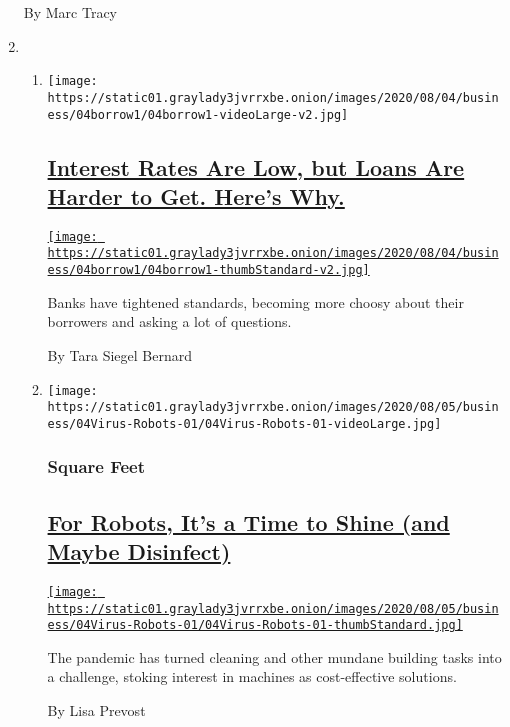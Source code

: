 \begin{enumerate}
  By Marc Tracy
\item
  \begin{enumerate}
  \def\labelenumii{\arabic{enumii}.}
  \item
    \texttt{[image: https://static01.graylady3jvrrxbe.onion/images/2020/08/04/business/04borrow1/04borrow1-videoLarge-v2.jpg]}

    \hypertarget{interest-rates-are-low-but-loans-are-harder-to-get-heres-why}{%
    \subsection{\texorpdfstring{\href{/2020/08/04/your-money/mortgage-loans-credit-cards-coronavirus.html}{Interest
    Rates Are Low, but Loans Are Harder to Get. Here's
    Why.}}{Interest Rates Are Low, but Loans Are Harder to Get. Here's Why.}}\label{interest-rates-are-low-but-loans-are-harder-to-get-heres-why}}

    \href{/2020/08/04/your-money/mortgage-loans-credit-cards-coronavirus.html}{\texttt{[image: https://static01.graylady3jvrrxbe.onion/images/2020/08/04/business/04borrow1/04borrow1-thumbStandard-v2.jpg]}}

    Banks have tightened standards, becoming more choosy about their
    borrowers and asking a lot of questions.

    By Tara Siegel Bernard
  \item
    \texttt{[image: https://static01.graylady3jvrrxbe.onion/images/2020/08/05/business/04Virus-Robots-01/04Virus-Robots-01-videoLarge.jpg]}

    \hypertarget{square-feet}{%
    \subsubsection{Square Feet}\label{square-feet}}

    \hypertarget{for-robots-its-a-time-to-shine-and-maybe-disinfect}{%
    \subsection{\texorpdfstring{\href{/2020/08/04/business/robot-cleaning-coronavirus.html}{For
    Robots, It's a Time to Shine (and Maybe
    Disinfect)}}{For Robots, It's a Time to Shine (and Maybe Disinfect)}}\label{for-robots-its-a-time-to-shine-and-maybe-disinfect}}

    \href{/2020/08/04/business/robot-cleaning-coronavirus.html}{\texttt{[image: https://static01.graylady3jvrrxbe.onion/images/2020/08/05/business/04Virus-Robots-01/04Virus-Robots-01-thumbStandard.jpg]}}

    The pandemic has turned cleaning and other mundane building tasks
    into a challenge, stoking interest in machines as cost-effective
    solutions.

    By Lisa Prevost
  \end{enumerate}
\end{enumerate}

